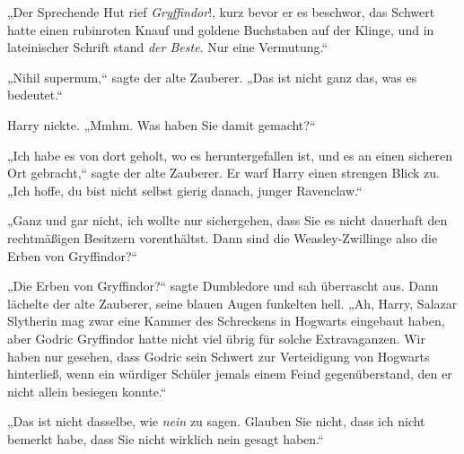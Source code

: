 „Der Sprechende Hut rief \emph{Gryffindor}!, kurz bevor er es beschwor, das Schwert hatte einen rubinroten Knauf und goldene Buchstaben auf der Klinge, und in lateinischer Schrift stand \emph{der Beste}. Nur eine Vermutung.“

„Nihil supernum,“ sagte der alte Zauberer. „Das ist nicht ganz das, was es bedeutet.“

Harry nickte. „Mmhm. Was haben Sie damit gemacht?“

„Ich habe es von dort geholt, wo es heruntergefallen ist, und es an einen sicheren Ort gebracht,“ sagte der alte Zauberer. Er warf Harry einen strengen Blick zu. „Ich hoffe, du bist nicht selbst gierig danach, junger Ravenclaw.“

„Ganz und gar nicht, ich wollte nur sichergehen, dass Sie es nicht dauerhaft den rechtmäßigen Besitzern vorenthältst. Dann sind die Weasley-Zwillinge also die Erben von Gryffindor?“

„Die Erben von Gryffindor?“ sagte Dumbledore und sah überrascht aus.
Dann lächelte der alte Zauberer, seine blauen Augen funkelten hell.
„Ah, Harry, Salazar Slytherin mag zwar eine Kammer des Schreckens in Hogwarts eingebaut haben, aber Godric Gryffindor hatte nicht viel übrig für solche Extravaganzen. Wir haben nur gesehen, dass Godric sein Schwert zur Verteidigung von Hogwarts hinterließ, wenn ein würdiger Schüler jemals einem Feind gegenüberstand, den er nicht allein besiegen konnte.“

„Das ist nicht dasselbe, wie \emph{nein} zu sagen. Glauben Sie nicht, dass ich nicht bemerkt habe, dass Sie nicht wirklich nein gesagt haben.“

